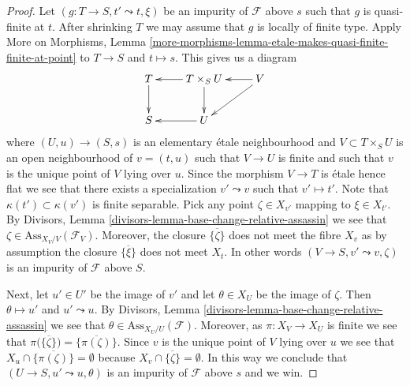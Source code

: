 \documentclass[10pt,a4paper]{amsart}
\theoremstyle{plain}
\theoremstyle{definition}
\theoremstyle{remark}
\numberwithin{equation}{subsection}
\begin{document}
\begin{proof}
Let $(g : T \to S, t' \leadsto t, \xi)$ be an impurity of
$\mathcal{F}$ above $s$ such that $g$ is quasi-finite at $t$.
After shrinking $T$ we may assume that $g$ is locally of finite type.
Apply
More on Morphisms,
Lemma \ref{more-morphisms-lemma-etale-makes-quasi-finite-finite-at-point}
to $T \to S$ and $t \mapsto s$. This gives us a diagram
$$
\xymatrix{
T \ar[d] & T \times_S U \ar[l] \ar[d] & V \ar[l] \ar[ld] \\
S & U \ar[l]
}
$$
where $(U, u) \to (S, s)$ is an elementary \'etale neighbourhood
and $V \subset T \times_S U$ is an open neighbourhood of $v = (t, u)$
such that $V \to U$ is finite and such that $v$ is the unique point of $V$
lying over $u$. Since the morphism $V \to T$ is \'etale
hence flat we see that there exists a specialization $v' \leadsto v$ such
that $v' \mapsto t'$. Note that $\kappa(t') \subset \kappa(v')$
is finite separable. Pick any point $\zeta \in X_{v'}$ mapping to
$\xi \in X_{t'}$. By
Divisors, Lemma \ref{divisors-lemma-base-change-relative-assassin}
we see that $\zeta \in \text{Ass}_{X_V/V}(\mathcal{F}_V)$.
Moreover, the closure $\overline{\{\zeta\}}$ does not meet
the fibre $X_v$ as by assumption the closure $\overline{\{\xi\}}$
does not meet $X_t$. In other words $(V \to S, v' \leadsto v, \zeta)$
is an impurity of $\mathcal{F}$ above $S$.

\medskip\noindent
Next, let $u' \in U'$ be the image of $v'$ and let
$\theta \in X_U$ be the image of $\zeta$.
Then $\theta \mapsto u'$ and $u' \leadsto u$.
By
Divisors, Lemma \ref{divisors-lemma-base-change-relative-assassin}
we see that $\theta \in \text{Ass}_{X_U/U}(\mathcal{F})$.
Moreover, as $\pi : X_V \to X_U$ is finite we see that
$\pi\big(\overline{\{\zeta\}}\big) = \overline{\{\pi(\zeta)\}}$. Since
$v$ is the unique point of $V$ lying over $u$ we see that
$X_u \cap \overline{\{\pi(\zeta)\}} = \emptyset$ because
$X_v \cap \overline{\{\zeta\}} = \emptyset$. In this way we conclude that
$(U \to S, u' \leadsto u, \theta)$ is an impurity of
$\mathcal{F}$ above $s$ and we win.
\end{proof}
\end{document}
